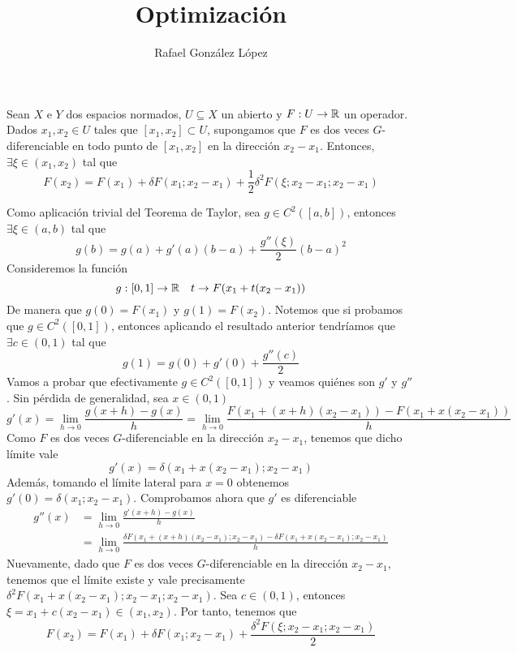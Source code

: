 \documentclass[twoside]{article}
\begin{document}
\title{Optimización}
\author{Rafael González López}
\maketitle

\begin{ejercicio}{1} Sean $X$ e $Y$ dos espacios normados, $U ⊆ X$ un abierto y $F : U \to \mathbb{R}$ un operador. Dados $x_1, x_2 ∈ U$ tales que $[x_1, x_2] ⊂ U$, supongamos que $F$ es dos veces $G$-diferenciable en todo punto de $[x_1, x_2]$ en la dirección $x_2 − x_1$. Entonces, $\exists \xi  \in (x_1,x_2)$ tal que
$$
F(x_2)= F(x_1) + \delta F(x_1;x_2-x_1)+\frac{1}{2}\delta^2 F(\xi;x_2-x_1;x_2-x_1)
$$
\end{ejercicio}
\begin{solucion}
Como aplicación trivial del Teorema de Taylor, sea $g\in C^2([a,b])$, entonces $\exists \xi \in (a,b)$ tal que
$$
g(b)=g(a)+g'(a)(b-a) +\frac{g''(\xi)}{2}(b-a)^2
$$
Consideremos la función 
$$
g:[0,1]\to \mathbb{R} \quad  t\to F(x_1+t(x_2-x_1))
$$
De manera que $g(0)=F(x_1)$ y $g(1)=F(x_2)$. Notemos que si probamos que $g\in C^2([0,1])$, entonces aplicando el resultado anterior tendríamos que $\exists c \in (0,1)$ tal que
$$
g(1) = g(0) + g'(0)+\frac{g''(c)}{2}
$$
Vamos a probar que efectivamente $g\in C^2([0,1])$ y veamos quiénes son $g'$ y $g''$. Sin pérdida de generalidad, sea $x\in (0,1)$
$$
g'(x) = \lim_{h\to 0} \frac{g(x+h)-g(x)}{h} = \lim_{h\to0} \frac{ F(x_1+(x+h)(x_2-x_1))- F(x_1+x(x_2-x_1))}{h}
$$
Como $F$ es dos veces $G$-diferenciable en la dirección $x_2-x_1$, tenemos que dicho límite vale
$$
g'(x) = \delta(x_1 + x(x_2-x_1);x_2-x_1)
$$
Además, tomando el límite lateral para $x=0$ obtenemos $g'(0) = \delta(x_1;x_2-x_1)$. Comprobamos ahora que $g'$ es diferenciable
\begin{align*}
g''(x) &= \lim_{h\to0}\frac{g'(x+h)-g(x)}{h}\\
&= \lim_{h\to0} \frac{\delta F(x_1+(x+h)(x_2-x_1);x_2-x_1)- \delta F(x_1+x(x_2-x_1);x_2-x_1)}{h}
\end{align*}
Nuevamente, dado que $F$ es dos veces $G$-diferenciable en la dirección $x_2-x_1$, tenemos que el límite existe y vale precisamente $\delta^2 F(x_1+x(x_2-x_1);x_2-x_1;x_2-x_1)$. Sea $c\in (0,1)$, entonces $\xi = x_1 +c(x_2-x_1) \in (x_1,x_2)$. Por tanto, tenemos que
$$
F(x_2) = F(x_1) + \delta F(x_1;x_2-x_1) + \frac{\delta^2 F(\xi;x_2-x_1;x_2-x_1)}{2}
$$
\end{solucion}
\end{document}
